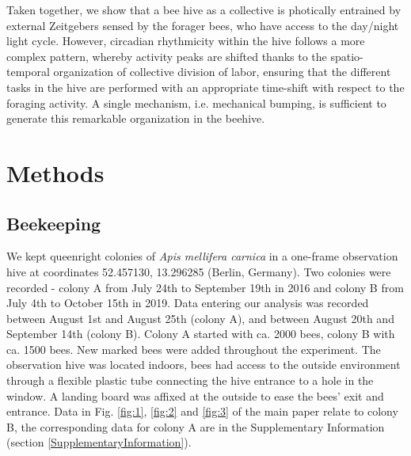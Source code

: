 \documentclass{article}
\begin{document}
Taken together, we show that a bee hive as a collective is photically entrained by external Zeitgebers sensed by the forager bees, who have access to the day/night light cycle. However, circadian rhythmicity within the hive follows a more complex pattern, whereby activity peaks are shifted thanks to the spatio-temporal organization of collective division of labor, ensuring that the different tasks in the hive are performed with an appropriate time-shift with respect to the foraging activity. A single mechanism, i.e. mechanical bumping, is sufficient to generate this remarkable organization in the beehive. 
 
\section{Methods}

\subsection*{Beekeeping}
We kept queenright colonies of \textit{Apis mellifera carnica} in a one-frame observation hive at coordinates 52.457130, 13.296285 (Berlin, Germany). Two colonies were recorded - colony A from July 24th to September 19th in 2016 and colony B from July 4th to October 15th in 2019. Data entering our analysis was recorded between August 1st and August 25th (colony A), and between August 20th and September 14th (colony B). Colony A started with ca. 2000 bees, colony B with ca. 1500 bees. New marked bees were added throughout the experiment. The observation hive was located indoors, bees had access to the outside environment through a flexible plastic tube connecting the hive entrance to a hole in the window. A landing board was affixed at the outside to ease the bees' exit and entrance. Data in Fig. \ref{fig:1}, \ref{fig:2} and \ref{fig:3} of the main paper relate to colony B, the corresponding data for colony A are in the Supplementary Information (section \ref{SupplementaryInformation}).
\end{document}
